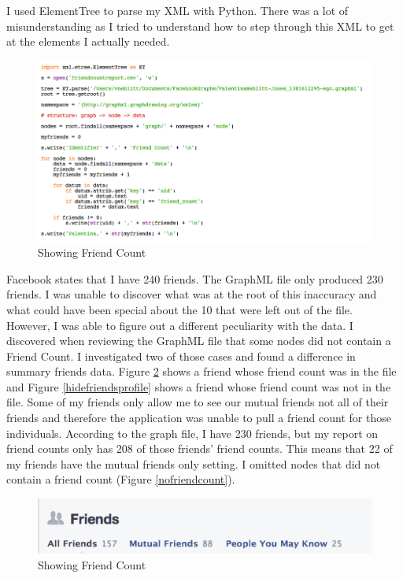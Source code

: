 \documentclass{article}
\begin{document}
I used ElementTree to parse my XML with Python. There was a lot of misunderstanding as I tried to understand how to step through this XML to get at the elements I actually needed.


\begin{figure}[H]
\centering
\includegraphics[scale=0.50]{q1/GetFriendCountsCode}
\caption{Showing Friend Count}
\label{GetFriendCountsCode}
\end{figure}

Facebook states that I have 240 friends. The GraphML file only produced 230 friends. I was unable to discover what was at the root of this inaccuracy and what could have been special about the 10 that were left out of the file. \\

However, I was able to figure out a different peculiarity with the data. I discovered when reviewing the GraphML file that some nodes did not contain a Friend Count. I investigated two of those cases and found a difference in summary friends data. Figure \ref{showfriendsprofile} shows a friend whose friend count was in the file and Figure \ref{hidefriendsprofile} shows a friend whose friend count was not in the file. Some of my friends only allow me to see our mutual friends not all of their friends and therefore the application was unable to pull a friend count for those individuals. According to the graph file, I have 230 friends, but my report on friend counts only has 208 of those friends' friend counts. This means that 22 of my friends have the mutual friends only setting. I omitted nodes that did not contain a friend count (Figure \ref{nofriendcount}).

\begin{figure}[H]
\centering
\includegraphics[scale=0.75]{q1/showfriendsprofile}
\caption{Showing Friend Count}
\label{showfriendsprofile}
\end{figure}
\end{document}
